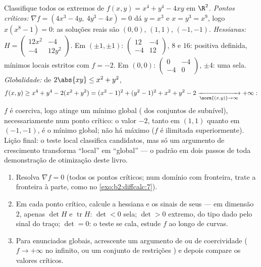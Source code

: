 \begin{example}\label{ex:b2:diffcalc:quarticrun}
Classifique todos os extremos de $f(x, y) = x^4 + y^4 - 4xy$ em $\R^2$.
\emph{Pontos críticos:} $\nabla f = (4x^3 - 4y,\ 4y^3 - 4x) =
0$ dá $y = x^3$ e $x = y^3 = x^9$, logo $x(x^8 - 1) = 0$:
as soluções reais são $(0,0)$, $(1,1)$, $(-1,-1)$.
\emph{Hessianas:} $H = \begin{pmatrix} 12x^2 & -4\\ -4 &
12y^2\end{pmatrix}$. Em $(\pm1, \pm1)$: $\begin{pmatrix} 12 &
-4\\ -4 & 12\end{pmatrix}$,  $8$ e $16$: positiva
definida, mínimos locais estritos com $f = -2$. Em $(0,0)$:
$\begin{pmatrix} 0 & -4\\ -4 & 0\end{pmatrix}$, 
$\pm4$: uma sela. \emph{Globalidade:} de $2\abs{xy} \leq x^2 +
y^2$,
\[
f(x, y) \geq x^4 + y^4 - 2(x^2 + y^2)
= (x^2 - 1)^2 + (y^2 - 1)^2 + x^2 + y^2 - 2
\xrightarrow[\norm{(x,y)}\to\infty]{} +\infty :
\]
$f$ é coerciva, logo atinge um mínimo global
( dos conjuntos de subnível), necessariamente num ponto
crítico: o valor $-2$, tanto em $(1,1)$ quanto em $(-1,-1)$, é o
mínimo global; não há máximo ($f$ é ilimitada superiormente).
Lição final: o teste local classifica candidatos, mas
só um argumento de crescimento transforma ``local'' em ``global'' --- o
padrão em dois passos de toda demonstração de otimização deste livro.
\end{example}

\begin{method}\label{met:b2:diffcalc:extrema}
\begin{enumerate}
  \item Resolva $\nabla f = 0$ (todos os pontos críticos; num domínio
        com fronteira, trate a fronteira à parte, como no
        \cref{exo:b2:diffcalc:7}).
  \item Em cada ponto crítico, calcule a hessiana e os sinais de seus
         --- em dimensão $2$, apenas $\det H$
        e $\operatorname{tr} H$: $\det < 0$ sela; $\det >
        0$ extremo, do tipo dado pelo sinal do
        traço; $\det = 0$: o teste se cala, estude $f$
        ao longo de curvas.
  \item Para enunciados globais, acrescente um argumento de  ou de coercividade
        ($f \to +\infty$ no infinito, ou um conjunto de restrições
        ) e depois compare os valores críticos.
\end{enumerate}
\end{method}

